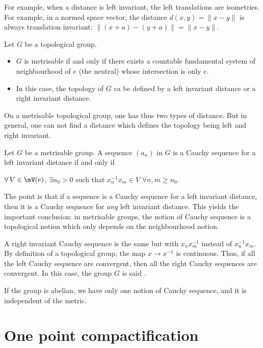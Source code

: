 For example, when a distance is left invariant, the left translations are isometries. For example, in a normed space vector, the distance $d(x,y)=\|x-y\|$ is always translation invariant: $\| (x+a)-(y+a) \|=\|x-y\|$.



\begin{proposition} Let $G$ be a topological group.
\begin{itemize}
\item $G$ is metrisable if and only if there exists a countable fundamental system of neighbourhood of $e$ (the neutral) whose intersection is only $e$.
\item In this case, the topology of $G$ ca be defined by a left invariant distance or a right invariant distance.
\end{itemize}
\end{proposition}




On a metrisable topological group, one has thus two types of distance. But in general, one can not find a distance which defines the topology being left and right invariant.

\begin{proposition}
Let $G$ be a metrisable group. A sequence $(a_n)$ in $G$ is a Cauchy sequence for a left invariant distance if and only if
	
 $\forall\, V\in\mV(e)$, $\exists n_0>0$ such that $x_n^{-1} x_m\in V$ $\forall n,m\geq n_0$.
\label{prop:Cauchy_metrisable}
\end{proposition}

The point is that if a sequence is a Cauchy sequence for a left invariant distance, then it is a Cauchy sequence for \emph{any} left invariant distance. This yields the important conclusion: in metrisable groups, the notion of Cauchy sequence is a topological notion which only depends on the neighbourhood notion.

A right invariant Cauchy sequence is the same but with $x_nx_m^{-1}$ instead of $x_n^{-1} x_m$. By definition of a topological group, the map $x\to x^{-1}$ is continuous. Thus, if all the left Cauchy sequence are convergent, then all the right Cauchy sequences are convergent. In this case, the group $G$ is said .

If the group is abelian, we have only one notion of Cauchy sequence, and it is independent of the metric.

\section{One point compactification}  \label{sec:compactific}

